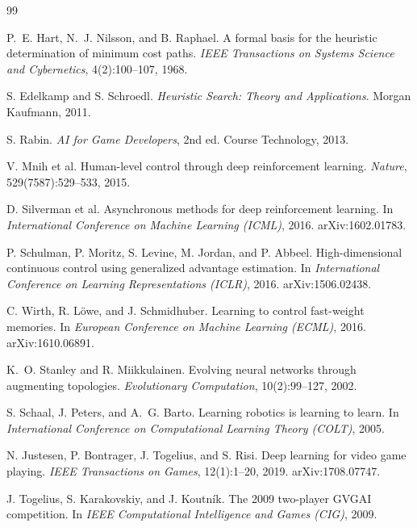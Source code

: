 \documentclass[a4paper]{article}
\begin{document}
\begin{thebibliography}{99}

P.~E. Hart, N.~J. Nilsson, and B. Raphael.
\newblock A formal basis for the heuristic determination of minimum cost paths.
\newblock \textit{IEEE Transactions on Systems Science and Cybernetics},
  4(2):100--107, 1968.

S. Edelkamp and S. Schroedl.
\newblock \textit{Heuristic Search: Theory and Applications}.
\newblock Morgan Kaufmann, 2011.

S. Rabin.
\newblock \textit{AI for Game Developers}, 2nd ed.
\newblock Course Technology, 2013.

V. Mnih et al.
\newblock Human-level control through deep reinforcement learning.
\newblock \textit{Nature}, 529(7587):529--533, 2015.

D. Silverman et al.
\newblock Asynchronous methods for deep reinforcement learning.
\newblock In \textit{International Conference on Machine Learning (ICML)}, 2016.
\newblock arXiv:1602.01783.

P. Schulman, P. Moritz, S. Levine, M. Jordan, and P. Abbeel.
\newblock High-dimensional continuous control using generalized advantage
  estimation.
\newblock In \textit{International Conference on Learning Representations
  (ICLR)}, 2016.
\newblock arXiv:1506.02438.

C. Wirth, R. Löwe, and J. Schmidhuber.
\newblock Learning to control fast-weight memories.
\newblock In \textit{European Conference on Machine Learning (ECML)}, 2016.
\newblock arXiv:1610.06891.

K.~O. Stanley and R. Miikkulainen.
\newblock Evolving neural networks through augmenting topologies.
\newblock \textit{Evolutionary Computation}, 10(2):99--127, 2002.

S. Schaal, J. Peters, and A.~G. Barto.
\newblock Learning robotics is learning to learn.
\newblock In \textit{International Conference on Computational Learning Theory
  (COLT)}, 2005.

N. Justesen, P. Bontrager, J. Togelius, and S. Risi.
\newblock Deep learning for video game playing.
\newblock \textit{IEEE Transactions on Games}, 12(1):1--20, 2019.
\newblock arXiv:1708.07747.

J. Togelius, S. Karakovskiy, and J. Koutník.
\newblock The 2009 two-player {GVGAI} competition.
\newblock In \textit{IEEE Computational Intelligence and Games (CIG)}, 2009.


\end{thebibliography}
\end{document}
